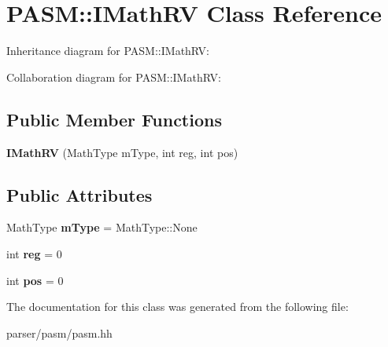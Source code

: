 \hypertarget{classPASM_1_1IMathRV}{}\section{P\+A\+SM\+:\+:I\+Math\+RV Class Reference}
\label{classPASM_1_1IMathRV}


Inheritance diagram for P\+A\+SM\+:\+:I\+Math\+RV\+:


Collaboration diagram for P\+A\+SM\+:\+:I\+Math\+RV\+:
\subsection*{Public Member Functions}
\begin{DoxyCompactItemize}
\item 
\mbox{\label{classPASM_1_1IMathRV_a3579d8a851ddddf22577485e89412d04}} 
{\bfseries I\+Math\+RV} (Math\+Type m\+Type, int reg, int pos)
\end{DoxyCompactItemize}
\subsection*{Public Attributes}
\begin{DoxyCompactItemize}
\item 
\mbox{\label{classPASM_1_1IMathRV_a656cc581baa436ff6a7a0716a5f53df1}} 
Math\+Type {\bfseries m\+Type} = Math\+Type\+::\+None
\item 
\mbox{\label{classPASM_1_1IMathRV_a45e6bc221e0d5c524890fb518ad0709a}} 
int {\bfseries reg} = 0
\item 
\mbox{\label{classPASM_1_1IMathRV_aeae79321bb6d1f8bdf62811b836d8395}} 
int {\bfseries pos} = 0
\end{DoxyCompactItemize}


The documentation for this class was generated from the following file\+:\begin{DoxyCompactItemize}
\item 
parser/pasm/pasm.\+hh\end{DoxyCompactItemize}
